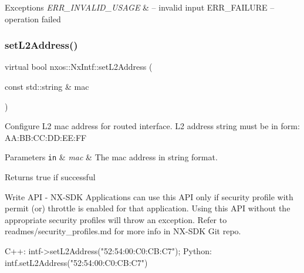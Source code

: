\begin{DoxyExceptions}{Exceptions}
{\em E\+R\+R\+\_\+\+I\+N\+V\+A\+L\+I\+D\+\_\+\+U\+S\+A\+GE} & -- invalid input E\+R\+R\+\_\+\+F\+A\+I\+L\+U\+RE -- operation failed \\
\hline
\end{DoxyExceptions}
\mbox{\label{classnxos_1_1_nx_intf_a90a3cca36e76717085fecf575e815139}} 
\subsubsection{\texorpdfstring{set\+L2\+Address()}{setL2Address()}}
{\footnotesize\ttfamily virtual bool nxos\+::\+Nx\+Intf\+::set\+L2\+Address (\begin{DoxyParamCaption}\item[{const std\+::string \&}]{mac }\end{DoxyParamCaption})\hspace{0.3cm}{\ttfamily [pure virtual]}}

Configure L2 mac address for routed interface. L2 address string must be in form\+: A\+A\+:\+B\+B\+:\+C\+C\+:\+D\+D\+:\+EE\+:FF 
\begin{DoxyParams}[1]{Parameters}
\mbox{\tt in}  & {\em mac} & The mac address in string format. \\
\hline
\end{DoxyParams}
\begin{DoxyReturn}{Returns}
true if successful
\end{DoxyReturn}
\begin{DoxyVerb}Write API - NX-SDK Applications can use this API only if security profile with permit (or) throttle is 
            enabled for that application. Using this API without the appropriate security profiles will
            throw an exception. Refer to readmes/security_profiles.md for more info in NX-SDK Git repo.
\end{DoxyVerb}



\begin{DoxyCode}
C++:
      intf->setL2Address(\textcolor{stringliteral}{"52:54:00:C0:CB:C7"});
Python:
      intf.setL2Address(\textcolor{stringliteral}{"52:54:00:C0:CB:C7"})
\end{DoxyCode}



